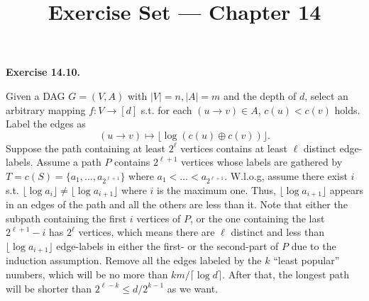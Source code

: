\documentclass[a4paper]{article}
\title{Exercise Set --- Chapter 14}
\date{}
\newenvironment{exercise}[1]{
	\par
	\noindent\textbf{Exercise #1.}\quad
}{
	\par
	\bigskip
}
\begin{document}
    \maketitle

    \begin{exercise}{14.10}
        Given a DAG $G = (V, A)$ with $|V| = n, |A| = m$ and the depth of $d$, select an arbitrary mapping $f: V \to [d]$ s.t. for each $(u \to v) \in A$, $c(u) < c(v)$ holds. Label the edges as 
        \[
           (u \to v) \mapsto \lfloor \log(c(u)\oplus c(v))\rfloor.
        \]
        Suppose the path containing at least $2^\ell$ vertices contains at least $\ell$ distinct edge-labels. Assume a path $P$ contains $2^{\ell + 1}$ vertices whose labels are gathered by $T = c(S) = \{a_1, \ldots, a_{2^{\ell + 1}}\}$ where $a_1 < \ldots < a_{2^{\ell + 1}}$. W.l.o.g, assume there exist $i$ s.t. $\lfloor\log a_i\rfloor \neq \lfloor\log a_{i + 1}\rfloor$ where $i$ is the maximum one. Thus, $\lfloor \log a_{i + 1}\rfloor$ appears in an edges of the path and all the others are less than it. Note that either the subpath containing the first $i$ vertices of $P$, or the one containing the last $2^{\ell + 1} - i$ has $2^{\ell}$ vertices, which means there are $\ell$ distinct and less than $\lfloor \log a_{i + 1}\rfloor$ edge-labels in either the first- or the second-part of $P$ due to the induction assumption. Remove all the edges labeled by the $k$ ``least popular'' numbers, which will be no more than $km/\lceil\log d\rceil$. After that, the longest path will be shorter than $2^{\ell - k} \leq d/2^{k - 1}$ as we want.
    \end{exercise}
\end{document}
